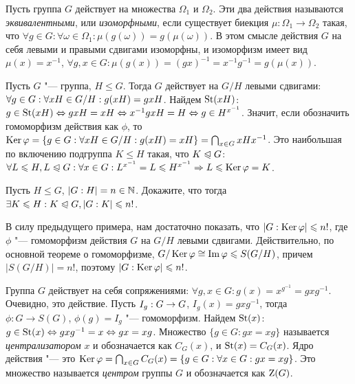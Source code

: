 \begin{note}
	Пусть группа $G$ действует на множества $\Omega_1$ и $\Omega_2$. Эти два действия называются \textit{эквивалентными}, или \textit{изоморфными}, если существует биекция $\mu: \Omega_1 \to \Omega_2$ такая, что $\forall g \in G: \forall \omega \in \Omega_1: \mu(g(\omega)) = g(\mu(\omega))$. В этом смысле действия $G$ на себя левыми и правыми сдвигами изоморфны, и изоморфизм имеет вид $\mu(x) = x^{-1}$, $\forall g, x \in G: \mu(g(x)) = (gx)^{-1} = x^{-1}g^{-1} = g(\mu(x))$.
\end{note}

\begin{example}
	Пусть $G$ "--- группа, $H \le G$. Тогда $G$ действует на $G / H$ левыми сдвигами: $\forall g \hm\in G: \forall xH \in G / H: g(xH) = gxH$. Найдем $\operatorname{St}(xH)$: $g \in \St(xH) \Leftrightarrow gxH = xH \Leftrightarrow x^{-1}gxH \hm= H \Leftrightarrow g \hm\in H^{x^{-1}}$. Значит, если обозначить гомоморфизм действия как $\phi$, то $\ke\phi \hm= \{g \hm\in G: \forall xH \in G / H: g(xH) = xH\} = \bigcap_{x \in G} xHx^{-1}$. Это наибольшая по включению подгруппа $K \le H$ такая, что $K \trianglelefteqslant G$: $\forall L \le H, L \normal G: \forall x \in G: L^{x^{-1}} = L \le H^{x^{-1}} \ra L \hm\le \ke\phi = K$.
\end{example}

\begin{exercise}
	Пусть $H \le G$, $|G : H| = n \in \mathbb{N}$. Докажите, что тогда $\exists K \le H: K \hm\normal G, |G : K| \le n!$.
\end{exercise}

\begin{solution}
	В силу предыдущего примера, нам достаточно показать, что $|G : \operatorname{Ker}\varphi| \leqslant n!$, где $\phi$ "--- гомоморфизм действия $G$ на $G / H$ левыми сдвигами. Действительно, по основной теореме о гомоморфизме, $G / \operatorname{Ker}\varphi \cong \operatorname{Im}\varphi \leqslant S(G / H)$, причем $|S(G / H)| = n!$, поэтому $|G : \operatorname{Ker}\varphi| \leqslant n!$.
\end{solution}

\begin{example}
	Группа $G$ действует на себя сопряжениями: $\forall g, x \in G: g(x) = x^{g^{-1}} = gxg^{-1}$. Очевидно, это действие. Пусть $I_g: G \hm\to G$, $I_g(x) = gxg^{-1}$, тогда $\phi: G \to S(G)$, $\phi(g) = I_g$ "--- гомоморфизм. Найдем $\operatorname{St}(x)$: $g \in \operatorname{St}(x) \Leftrightarrow gxg^{-1} = x \Leftrightarrow gx = xg$. Множество $\{g \in G: gx = xg\}$ называется \textit{централизатором} $x$ и обозначается как $C_G(x)$, и $\operatorname{St}(x) = C_G(x)$. Ядро действия "--- это $\ke\phi \hm= \bigcap_{x \in G} C_G(x) = \{g \in G: \forall x \in G: gx = xg\}$. Это множество называется \textit{центром} группы $G$ и обозначается как $\operatorname{Z}(G)$.
\end{example}

